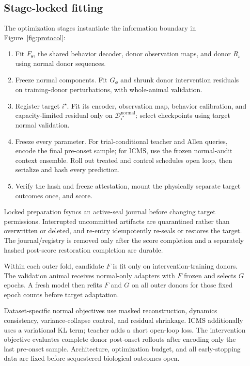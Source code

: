 \documentclass[11pt]{article}
\newcommand{\normal}{\mathrm{normal}}
\begin{document}
\subsection{Stage-locked fitting}

The optimization stages instantiate the information boundary in
Figure~\ref{fig:protocol}:

\begin{enumerate}[leftmargin=*,label=\textbf{Stage \arabic*.}]
  \item Fit \(F_\theta\), the shared behavior decoder, donor observation maps,
    and donor \(R_i\) using normal donor sequences.
  \item Freeze normal components. Fit \(G_\phi\) and shrunk donor
    intervention residuals on training-donor perturbations, with whole-animal
    validation.
  \item Register target \(i^\star\). Fit its encoder, observation map, behavior
    calibration, and capacity-limited residual only on
    \(\mathcal{D}_{i^\star}^{\normal}\); select checkpoints using target
    normal validation.
  \item Freeze every parameter. For trial-conditional teacher and Allen
    queries, encode the final pre-onset sample; for ICMS, use the frozen
    normal-audit context ensemble. Roll out treated and control schedules open
    loop, then serialize and hash every prediction.
  \item Verify the hash and freeze attestation, mount the physically separate
    target outcomes once, and score.
\end{enumerate}

Locked preparation fsyncs an active-seal journal before changing target
permissions. Interrupted uncommitted artifacts are quarantined rather than
overwritten or deleted, and re-entry idempotently re-seals or restores the
target. The journal/registry is removed only after the score completion and a
separately hashed post-score restoration completion are durable.

Within each outer fold, candidate \(F\) is fit only on intervention-training
donors. The validation animal receives normal-only adapters with \(F\) frozen
and selects \(G\) epochs. A fresh model then refits \(F\) and \(G\) on all
outer donors for those fixed epoch counts before target adaptation.

Dataset-specific normal objectives use masked reconstruction, dynamics
consistency, variance-collapse control, and residual shrinkage. ICMS
additionally uses a variational KL term; teacher adds a short open-loop loss.
The intervention objective evaluates complete donor post-onset rollouts after
encoding only the last pre-onset sample. Architecture,
optimization budget, and all early-stopping data are fixed before sequestered
biological outcomes open.
\end{document}
